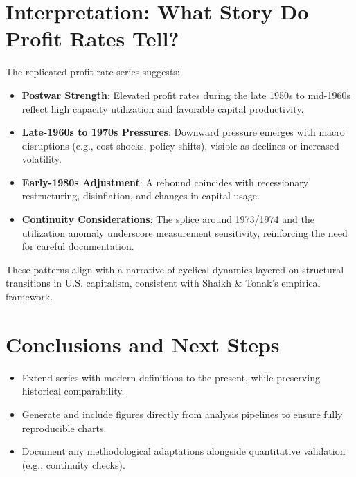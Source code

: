\documentclass[12pt,a4paper]{article}
\begin{document}
\section{Interpretation: What Story Do Profit Rates Tell?}
The replicated profit rate series suggests:
\begin{itemize}[leftmargin=1.2em]
    \item \textbf{Postwar Strength}: Elevated profit rates during the late 1950s to mid-1960s reflect high capacity utilization and favorable capital productivity.
    \item \textbf{Late-1960s to 1970s Pressures}: Downward pressure emerges with macro disruptions (e.g., cost shocks, policy shifts), visible as declines or increased volatility.
    \item \textbf{Early-1980s Adjustment}: A rebound coincides with recessionary restructuring, disinflation, and changes in capital usage.
    \item \textbf{Continuity Considerations}: The splice around 1973/1974 and the utilization anomaly underscore measurement sensitivity, reinforcing the need for careful documentation.
\end{itemize}
These patterns align with a narrative of cyclical dynamics layered on structural transitions in U.S. capitalism, consistent with Shaikh \& Tonak's empirical framework.

\section{Conclusions and Next Steps}
\begin{itemize}[leftmargin=1.2em]
    \item Extend series with modern definitions to the present, while preserving historical comparability.
    \item Generate and include figures directly from analysis pipelines to ensure fully reproducible charts.
    \item Document any methodological adaptations alongside quantitative validation (e.g., continuity checks).
\end{itemize}
\end{document}
